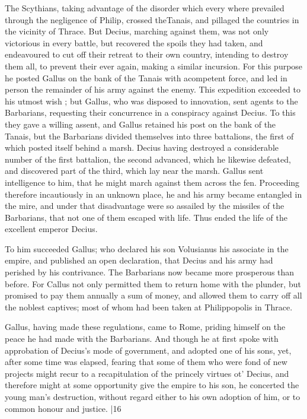 The Scythians, taking advantage of the disorder which every where prevailed through the negligence of Philip, crossed the\emph{}Tanais, and pillaged the countries in the vicinity of Thrace. But Decius, marching against them, was not only victorious in every battle, but recovered the spoils they had taken, and endeavoured to cut off their retreat to their own country, intending to destroy them all, to prevent their ever again, making a similar incursion. For this purpose he posted Gallus on the bank of the Tanais with a\emph{}competent force, and led in person the remainder of his army against the enemy. This expedition exceeded to his utmost wish ; but Gallus, who was disposed to innovation, sent agents to the Barbarians, requesting their concurrence in a conspiracy against Decius. To this they gave a willing assent, and Gallus retained his post on the bank of the Tanais, but the Barbarians divided themselves into three battalions, the first of which posted itself behind a marsh. Decius having destroyed a considerable number of the first battalion, the second advanced, which he likewise defeated, and discovered part of the third, which lay near the marsh. Gallus sent intelligence to him, that he might march against them across the fen. Proceeding therefore incautiously in an unknown place, he and his army became entangled in the mire, and under that disadvantage were so assailed by the missiles of the Barbarians, that not one of them escaped with life. Thus ended the life of the excellent emperor Decius.

To him succeeded Gallus; who declared his son Volusianus his associate in the empire, and published an open declaration, that Decius and his army had perished by his contrivance. The Barbarians now became more prosperous than before. For Callus not only permitted them to return home with the plunder, but promised to pay them annually a sum of money, and allowed them to carry off all the noblest captives; most of whom had been taken at Philippopolis in Thrace.

Gallus, having made these regulations, came to Rome, priding himself on the peace he had made with the Barbarians. And though he at first spoke with approbation of Decius's mode of government, and adopted one of his sons, yet, after some time was elapsed, fearing that some of them who were fond of new projects might recur to a recapitulation of the princely virtues ot' Decius, and therefore might at some opportunity give the empire to his son, he concerted the young man's destruction, without regard either to his own adoption of him, or to common honour and justice.
|16


